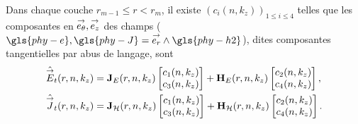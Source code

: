     \begin{prop}
      Dans chaque couche \(r_{m-1}\le r < r_m\), il existe \((c_i(n,k_z))_{1\le i\le 4}\) telles que les composantes en \({\overset{\rightarrow}{e_\theta}},{\overset{\rightarrow}{e_z}}\) des champs (\(\gls{phy-e},\gls{phy-J}=\vect{e_r}\pvect\gls{phy-h2}\)), dites composantes tangentielles par abus de langage, sont
      \begin{subequations}
        \begin{align}
          \hat {{\overset{\rightarrow}{E}}}_t(r,n,k_z) &= \mathbf{J}_{E}(r,n,k_z)
          \begin{bmatrix}
            c_1(n,k_z) \\
            c_3(n,k_z)
          \end{bmatrix}
          +
          \mathbf{H}_{E}(r,n,k_z)
          \begin{bmatrix}
            c_2(n,k_z) \\
            c_4(n,k_z)
          \end{bmatrix},
          \label{eq:imp_fourier:cylindre:Et}
          \\
          \hat{{\overset{\rightarrow}{J}}}_t(r,n,k_z) &=
          \mathbf{J}_{\mathcal{H}}(r,n,k_z)
          \begin{bmatrix}
            c_1(n,k_z) \\
            c_3(n,k_z)
          \end{bmatrix}
          +
          \mathbf{H}_{\mathcal{H}}(r,n,k_z)
          \begin{bmatrix}
            c_2(n,k_z) \\
            c_4(n,k_z)
          \end{bmatrix}.
          \label{eq:imp_fourier:cylindre:Ht}
        \end{align}
      \end{subequations}
    \end{prop}


